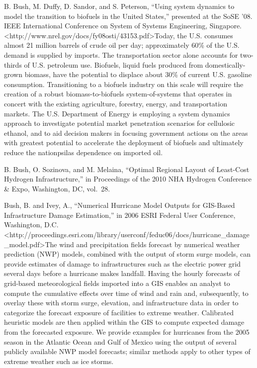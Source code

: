 \documentclass[]{article}
\begin{document}
B. Bush, M. Duffy, D. Sandor, and S. Peterson, ``Using system dynamics
to model the transition to biofuels in the United States,'' presented at
the SoSE '08. IEEE International Conference on System of Systems
Engineering, Singapore.
\textless{}http://www.nrel.gov/docs/fy08osti/43153.pdf\textgreater{}Today,
the U.S. consumes almost 21 million barrels of crude oil per day;
approximately 60\% of the U.S. demand is supplied by imports. The
transportation sector alone accounts for two-thirds of U.S. petroleum
use. Biofuels, liquid fuels produced from domestically-grown biomass,
have the potential to displace about 30\% of current U.S. gasoline
consumption. Transitioning to a biofuels industry on this scale will
require the creation of a robust biomass-to-biofuels system-of-systems
that operates in concert with the existing agriculture, forestry,
energy, and transportation markets. The U.S. Department of Energy is
employing a system dynamics approach to investigate potential market
penetration scenarios for cellulosic ethanol, and to aid decision makers
in focusing government actions on the areas with greatest potential to
accelerate the deployment of biofuels and ultimately reduce the
nationpsilas dependence on imported oil.

B. Bush, O. Sozinova, and M. Melaina, ``Optimal Regional Layout of
Least-Cost Hydrogen Infrastructure,'' in Proceedings of the 2010 NHA
Hydrogen Conference \& Expo, Washington, DC, vol.~28.

Bush, B. and Ivey, A., ``Numerical Hurricane Model Outputs for GIS-Based
Infrastructure Damage Estimation,'' in 2006 ESRI Federal User
Conference, Washington, D.C.
\textless{}http://proceedings.esri.com/library/userconf/feduc06/docs/hurricane\_damage\_model.pdf\textgreater{}The
wind and precipitation fields forecast by numerical weather prediction
(NWP) models, combined with the output of storm surge models, can
provide estimates of damage to infrastructures such as the electric
power grid several days before a hurricane makes landfall. Having the
hourly forecasts of grid-based meteorological fields imported into a GIS
enables an analyst to compute the cumulative effects over time of wind
and rain and, subsequently, to overlay these with storm surge,
elevation, and infrastructure data in order to categorize the forecast
exposure of facilities to extreme weather. Calibrated heuristic models
are then applied within the GIS to compute expected damage from the
forecasted exposure. We provide examples for hurricanes from the 2005
season in the Atlantic Ocean and Gulf of Mexico using the output of
several publicly available NWP model forecasts; similar methods apply to
other types of extreme weather such as ice storms.
\end{document}
